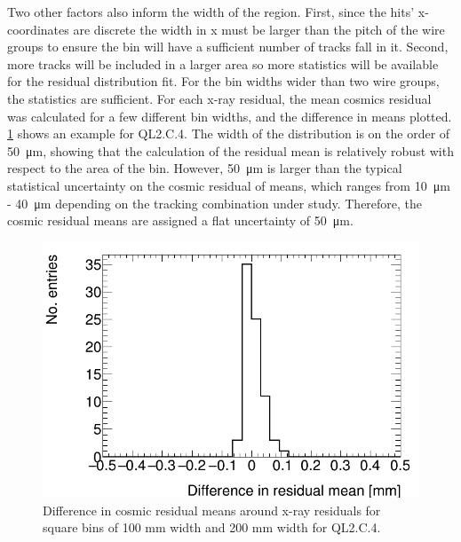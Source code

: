 Two other factors also inform the width of the region. First, since the hits' x-coordinates are discrete the width in x must be larger than the pitch of the wire groups to ensure the bin will have a sufficient number of tracks fall in it. Second, more tracks will be included in a larger area so more statistics will be available for the residual distribution fit. For the bin widths wider than two wire groups, the statistics are sufficient. For each x-ray residual, the mean cosmics residual was calculated for a few different bin widths, and the difference in means plotted. \ref{fig:area_bin_size_mean_diff} shows an example for QL2.C.4. The width of the distribution is on the order of \SI{50}{\micro\meter}, showing that the calculation of the residual mean is relatively robust with respect to the area of the bin. However, \SI{50}{\micro\meter} is larger than the typical statistical uncertainty on the cosmic residual of means, which ranges from \SI{10}{\micro\meter} - \SI{40}{\micro\meter} depending on the tracking combination under study. Therefore, the cosmic residual means are assigned a flat uncertainty of \SI{50}{\micro\meter}. 

\begin{figure}
    \centering
    \includegraphics[width = \textwidth]{figures/compare_residual_fits_around_xrays_QL2C04_3100V_2021-05-20_100mm_width_bins_minus_QL2C04_3100V_2021-06-02_200mm_width_bins_means_difference.png}
    \caption{Difference in cosmic residual means around x-ray residuals for square bins of 100 mm width and 200 mm width for QL2.C.4.}
    \label{fig:area_bin_size_mean_diff}
\end{figure}